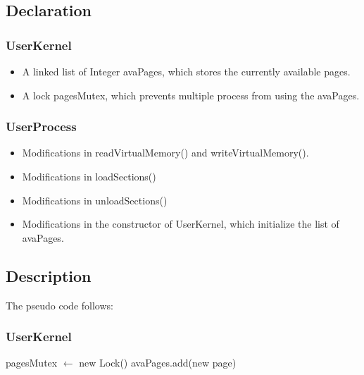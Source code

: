\documentclass{article}
\begin{document}
	\subsection{Declaration}
	\subsubsection*{UserKernel}
	\begin{itemize}
		\item A linked list of Integer avaPages, which stores the currently available pages.
		\item A lock pagesMutex, which prevents multiple process from using the avaPages.
	\end{itemize}
	\subsubsection*{UserProcess}
	\begin{itemize}
		\item Modifications in readVirtualMemory() and writeVirtualMemory().
		\item Modifications in loadSections()
		\item Modifications in unloadSections()
		\item Modifications in the constructor of UserKernel, which initialize the list of avaPages.
	\end{itemize}
	
	\subsection{Description}
	The pseudo code follows:
	\subsubsection*{UserKernel}
	\begin{algorithm}[H]
		\begin{algorithmic}
			\State pagesMutex $\leftarrow$ new Lock()
			\State avaPages.add(new page)
			\EndWhile
			\EndProcedure
		\end{algorithmic}
	\end{algorithm}
	
\end{document}
